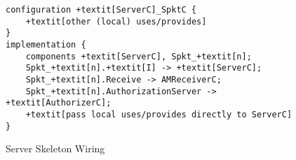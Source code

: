 \begin{figure}[!t]
\begin{textbox}{3.0in}
\begin{Verbatim}[commandchars=+\[\], fontsize=\small]
configuration +textit[ServerC]_SpktC {
    +textit[other (local) uses/provides]
}
implementation {
    components +textit[ServerC], Spkt_+textit[n];
    Spkt_+textit[n].+textit[I] -> +textit[ServerC];
    Spkt_+textit[n].Receive -> AMReceiverC;
    Spkt_+textit[n].AuthorizationServer -> +textit[AuthorizerC];
    +textit[pass local uses/provides directly to ServerC]
}
\end{Verbatim}
\end{textbox}
\caption{Server Skeleton Wiring}
\label{figure-server-skeleton-wiring}
\end{figure}

